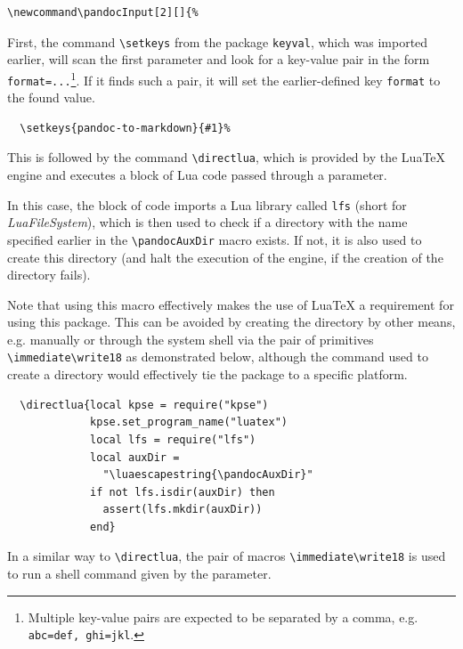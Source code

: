 \documentclass[
  digital,     %
  oneside,     %
  nosansbold,  %
  nocolorbold, %
  lof,         %
  nolot,       %
]{fithesis4}
\newcommand\macro[1]{\texttt{\textbackslash{}{#1}}}
\begin{document}
\noindent
\lstset{language=[LaTeX]TeX}
\begin{lstlisting}
\newcommand\pandocInput[2][]{%
\end{lstlisting}

\noindent
First, the command \macro{setkeys} from the package \texttt{keyval}, which was imported earlier, will scan the first parameter and look for a key-value pair in the form \texttt{format=...}\footnote{Multiple key-value pairs are expected to be separated by a comma, e.g. \texttt{abc=def,~ghi=jkl}.}. If it finds such a pair, it will set the earlier-defined key \texttt{format} to the found value.

\noindent
\lstset{language=[LaTeX]TeX}
\begin{lstlisting}
  \setkeys{pandoc-to-markdown}{#1}%
\end{lstlisting}

\noindent
This is followed by the command \macro{directlua}, which is provided by the Lua\TeX{} engine and executes a block of Lua code passed through a parameter.

In this case, the block of code imports a Lua library called \texttt{lfs} (short for \emph{LuaFileSystem}), which is then used to check if a directory with the name specified earlier in the \macro{pandocAuxDir} macro exists. If not, it is also used to create this directory (and halt the execution of the engine, if the creation of the directory fails).

Note that using this macro effectively makes the use of Lua\TeX{} a requirement for using this package. This can be avoided by creating the directory by other means, e.g. manually or through the system shell via the pair of primitives \macro{immediate}\macro{write18} as demonstrated below, although the command used to create a directory would effectively tie the package to a specific platform.

\noindent
\lstset{language=[LaTeX]TeX}
\begin{lstlisting}
  \directlua{local kpse = require("kpse")
             kpse.set_program_name("luatex")
             local lfs = require("lfs")
             local auxDir =
               "\luaescapestring{\pandocAuxDir}"
             if not lfs.isdir(auxDir) then
               assert(lfs.mkdir(auxDir))
             end}
\end{lstlisting}

\noindent
In a similar way to \macro{directlua}, the pair of macros \macro{immediate}\macro{write18} is used to run a shell command given by the parameter.
\end{document}
